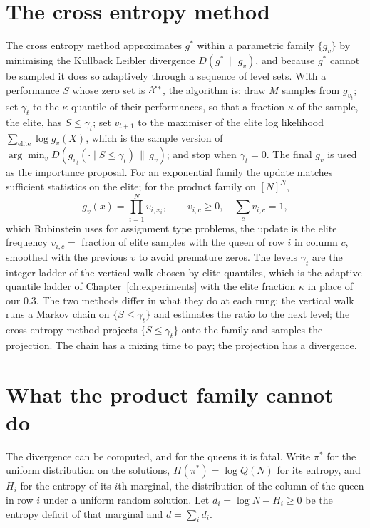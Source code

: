 \section{The cross entropy method}

The cross entropy method \cite{RubinsteinKroeseCE} approximates $g^*$ within a parametric family $\{ g_v \}$ by minimising the Kullback Leibler divergence $D(g^* \,\|\, g_v)$, and because $g^*$ cannot be sampled it does so adaptively through a sequence of level sets. With a performance $S$ whose zero set is $\mathcal{X}^*$, the algorithm is: draw $M$ samples from $g_{v_t}$; set $\gamma_t$ to the $\kappa$ quantile of their performances, so that a fraction $\kappa$ of the sample, the elite, has $S \le \gamma_t$; set $v_{t+1}$ to the maximiser of the elite log likelihood $\sum_{\text{elite}} \log g_v(X)$, which is the sample version of $\arg\min_v D( g_{v_t}(\cdot \mid S \le \gamma_t) \,\|\, g_v )$; and stop when $\gamma_t = 0$. The final $g_{v}$ is used as the importance proposal. For an exponential family the update matches sufficient statistics on the elite; for the product family on $[N]^N$,
\[
g_v(x) = \prod_{i=1}^N v_{i, x_i}, \qquad v_{i, c} \ge 0, \quad \sum_c v_{i,c} = 1 ,
\]
which Rubinstein uses for assignment type problems, the update is the elite frequency $v_{i,c} = $ fraction of elite samples with the queen of row $i$ in column $c$, smoothed with the previous $v$ to avoid premature zeros. The levels $\gamma_t$ are the integer ladder of the vertical walk chosen by elite quantiles, which is the adaptive quantile ladder of Chapter~\ref{ch:experiments} with the elite fraction $\kappa$ in place of our $0.3$. The two methods differ in what they do at each rung: the vertical walk runs a Markov chain on $\{ S \le \gamma_t \}$ and estimates the ratio to the next level; the cross entropy method projects $\{ S \le \gamma_t \}$ onto the family and samples the projection. The chain has a mixing time to pay; the projection has a divergence.

\section{What the product family cannot do}

The divergence can be computed, and for the queens it is fatal. Write $\pi^*$ for the uniform distribution on the solutions, $H(\pi^*) = \log Q(N)$ for its entropy, and $H_i$ for the entropy of its $i$th marginal, the distribution of the column of the queen in row $i$ under a uniform random solution. Let $d_i = \log N - H_i \ge 0$ be the entropy deficit of that marginal and $d = \sum_i d_i$.

